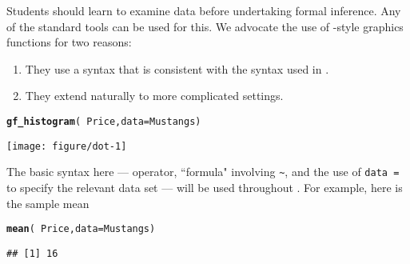\documentclass[11pt]{article}\usepackage[]{graphicx}\usepackage[]{color}
\makeatletter
\def\maxwidth{ %
  \ifdim\Gin@nat@width>\linewidth
    \linewidth
  \else
    \Gin@nat@width
  \fi
}
\newcommand{\hlopt}[1]{\textcolor[rgb]{0,0,0}{#1}}%
\newcommand{\hlstd}[1]{\textcolor[rgb]{0.345,0.345,0.345}{#1}}%
\newcommand{\hlkwc}[1]{\textcolor[rgb]{0.333,0.667,0.333}{#1}}%
\newcommand{\hlkwd}[1]{\textcolor[rgb]{0.737,0.353,0.396}{\textbf{#1}}}%
\newenvironment{kframe}{%
 \def\at@end@of@kframe{}%
 \ifinner\ifhmode%
  \def\at@end@of@kframe{\end{minipage}}%
  \begin{minipage}{\columnwidth}%
 \fi\fi%
 \def\FrameCommand##1{\hskip\@totalleftmargin \hskip-\fboxsep
 \colorbox{shadecolor}{##1}\hskip-\fboxsep
     \hskip-\linewidth \hskip-\@totalleftmargin \hskip\columnwidth}%
 \MakeFramed {\advance\hsize-\width
   \@totalleftmargin\z@ \linewidth\hsize
   \@setminipage}}%
 {\par\unskip\endMakeFramed%
 \at@end@of@kframe}
\newenvironment{knitrout}{}{} %
\makeatother
\begin{document}
Students should learn to examine data before undertaking formal inference.  Any of the 
standard \R{} tools can be used for this.  We advocate the use of -style graphics functions for two reasons:
\begin{enumerate}
\item They use a syntax that is consistent with the syntax used in .  
\item They extend naturally to more complicated settings.
\end{enumerate}
\begin{knitrout}
\color{fgcolor}\begin{kframe}
\begin{alltt}
\hlkwd{gf_histogram}\hlstd{(}\hlopt{~} \hlstd{Price,} \hlkwc{data} \hlstd{= Mustangs)}
\end{alltt}
\end{kframe}

{\centering \texttt{[image: figure/dot-1]} 

}



\end{knitrout}

The basic  syntax here --- operator, ``formula" involving \verb+~+, and the use of \texttt{data =} to specify the relevant data set --- will be used throughout .  For example, here is the sample mean 
\begin{knitrout}
\color{fgcolor}\begin{kframe}
\begin{alltt}
\hlkwd{mean}\hlstd{(}\hlopt{~} \hlstd{Price,} \hlkwc{data} \hlstd{= Mustangs)}
\end{alltt}
\begin{verbatim}
## [1] 16
\end{verbatim}
\end{kframe}
\end{knitrout}
\end{document}
